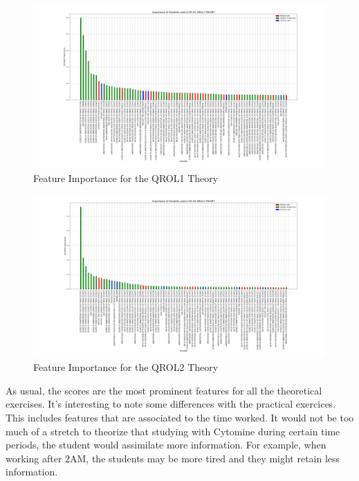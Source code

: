 \documentclass[a4paper,11pt]{report}
\numberwithin{figure}{section} %
\begin{document}
      \begin{figure}[H]
      \centering
      \includegraphics[width=.95\linewidth]{plots/var_importance_QROL1_THEORY_2018-05-02_20_54_23.png}
      \caption{Feature Importance for the QROL1 Theory}
      \label{fig:var_th2}
      \end{figure}
      
      \begin{figure}[H]
      \centering
      \includegraphics[width=.95\linewidth]{plots/var_importance_QROL2_THEORY_2018-05-02_20_53_44.png}
      \caption{Feature Importance for the QROL2 Theory}
      \label{fig:var_th3}
      \end{figure}    

    As usual, the scores are the most prominent features for all the theoretical exercises.
    It's interesting to note some differences with the practical exercices.
    This includes features that are associated to the time worked.
    It would not be too much of a stretch to theorize that studying with Cytomine during certain time periods, the student would assimilate more information.
    For example, when working after 2AM, the students may be more tired and they might retain less information.\\
\end{document}
